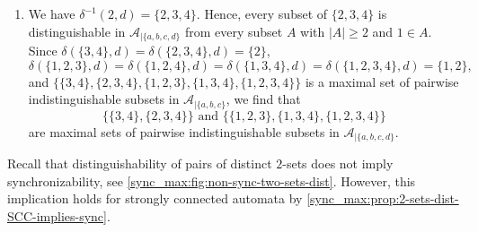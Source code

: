 \begin{example}
\begin{enumerate}
	 yield that
	\[
	\{\{1,2\},\{1,2,4\}\} \text{ and } \{ \{3,4\},  \{2,3,4\}, \{1,2,3\}, \{1,3,4\}, \{1,2,3,4\}\}
	\]
	are two maximal classes of pairwise indistinguishable subsets in $\mathcal A_{|\{a,b,c\}}$.	
		
	\item We have $\delta^{-1}(2, d) = \{2,3,4\}$.
	Hence, every subset of $\{2,3,4\}$
	is distinguishable in $\mathcal A_{|\{a,b,c,d\}}$
	from every subset $A$ with $|A| \ge 2$
	and $1 \in A$. Since $\delta(\{3,4\}, d) = \delta(\{2,3,4\}, d) = \{2\}$,
	\[
	\delta(\{1,2,3\}, d) = \delta(\{1,2,4\}, d) = \delta(\{1,3,4\}, d) = \delta(\{1,2,3,4\}, d) = \{1,2\},
	\]
	and $\{ \{3,4\},  \{2,3,4\}, \{1,2,3\}, \{1,3,4\}, \{1,2,3,4\}\}$
	is a maximal set of pairwise indistinguishable subsets in $\mathcal A_{|\{a,b,c\}}$,
	we find that 
	\[
	\{ \{3,4\}, \{2,3,4\}\} \text{ and }
	\{ \{1,2,3\}, \{1,3,4\}, \{1,2,3,4\}\}
	\]
	are maximal sets of pairwise indistinguishable subsets in $\mathcal A_{|\{a,b,c,d\}}$.
	\end{enumerate}
\end{example}

Recall that distinguishability of pairs of distinct $2$-sets
does not imply synchronizability, see \cref{sync_max:fig:non-sync-two-sets-dist}.
However, this implication holds for strongly connected
automata by \cref{sync_max:prop:2-sets-dist-SCC-implies-sync}.
